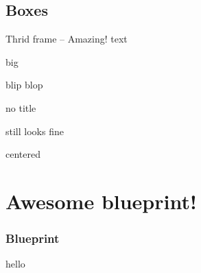 \documentclass[aspectratio=169]{beamer}
\begin{document}
\subsection{Boxes}
\begin{frame}{Thrid frame -- Amazing!}
  text

  \begin{tcolorbox}[frame hidden,fuzzy shadow={1mm}{-1mm}{0mm}{.3mm}{black},enhanced,colback=mycolor]
    big
  \end{tcolorbox}


  \begin{center}
  \end{center}

  \begin{block}{blip}
    blop
  \end{block}

  \begin{block}{}
    no title

    still looks fine
  \end{block}

  \begin{center}
    \begin{block}{}
      centered
    \end{block}
  \end{center}
\end{frame}


\section{Awesome blueprint!}
\begin{blueprintframe}
  \frametitle{Blueprint}
  hello
\end{blueprintframe}
\end{document}

